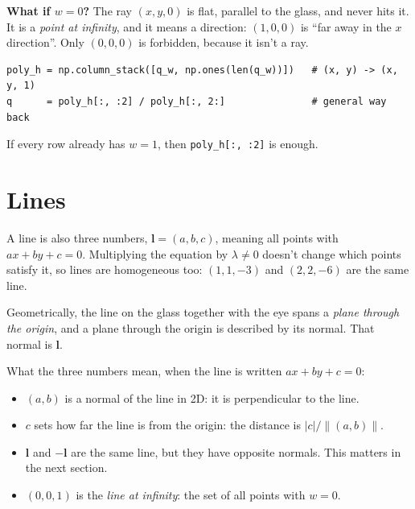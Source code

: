 \documentclass[11pt,a4paper]{article}
\newcommand{\vect}[1]{\mathbf{#1}}
\newcommand{\vl}{\vect{l}}
\begin{document}
\textbf{What if $w=0$?} The ray $(x,y,0)$ is flat, parallel to the glass, and never hits it. It is a
\emph{point at infinity}, and it means a direction: $(1,0,0)$ is ``far away in the $x$ direction''.
Only $(0,0,0)$ is forbidden, because it isn't a ray.

\begin{oursbox}
\begin{lstlisting}
poly_h = np.column_stack([q_w, np.ones(len(q_w))])   # (x, y) -> (x, y, 1)
q      = poly_h[:, :2] / poly_h[:, 2:]               # general way back
\end{lstlisting}
If every row already has $w=1$, then \texttt{poly\_h[:, :2]} is enough.
\end{oursbox}

\section{Lines}

A line is also three numbers, $\vl=(a,b,c)$, meaning all points with $ax+by+c=0$. Multiplying the equation by $\lambda\ne0$
doesn't change which points satisfy it, so lines are homogeneous too: $(1,1,-3)$ and $(2,2,-6)$ are the same line.

Geometrically, the line on the glass together with the eye spans a \emph{plane through the origin}, and a plane through the
origin is described by its normal. That normal is $\vl$.

\begin{center}
\end{center}

What the three numbers mean, when the line is written $ax+by+c=0$:
\begin{itemize}
\item $(a,b)$ is a normal of the line in 2D: it is perpendicular to the line.
\item $c$ sets how far the line is from the origin: the distance is $|c|/\|(a,b)\|$.
\item $\vl$ and $-\vl$ are the same line, but they have opposite normals. This matters in the next section.
\item $(0,0,1)$ is the \emph{line at infinity}: the set of all points with $w=0$.
\end{itemize}
\end{document}
